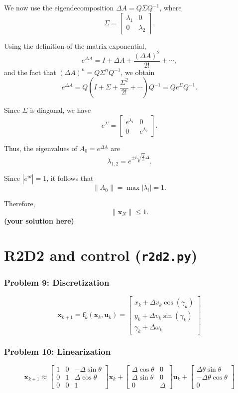 \documentclass[12pt,twoside]{article}
\newcommand\redt[1]{ {\textcolor[rgb]{0.60, 0.00, 0.00}{\textbf{ #1} } } }
\newcommand{\m}[1]{\boldsymbol{ #1}}
\newcommand{\yoursolution}{ \redt{(your solution here) } }
\begin{document}
We now use the eigendecomposition $\Delta A = Q \Sigma Q^{-1}$, where
\[
\Sigma =
\begin{bmatrix}
\lambda_1 & 0 \\
0 & \lambda_2
\end{bmatrix}.
\]

Using the definition of the matrix exponential,
\[
e^{\Delta A} = I + \Delta A + \frac{(\Delta A)^2}{2!} + \cdots,
\]
and the fact that $(\Delta A)^n = Q \Sigma^n Q^{-1}$, we obtain
\[
e^{\Delta A}
= Q \left( I + \Sigma + \frac{\Sigma^2}{2!} + \cdots \right) Q^{-1}
= Q e^{\Sigma} Q^{-1}.
\]

Since $\Sigma$ is diagonal, we have
\[
e^{\Sigma} =
\begin{bmatrix}
e^{\lambda_1} & 0 \\
0 & e^{\lambda_2}
\end{bmatrix}.
\]

Thus, the eigenvalues of $A_0 = e^{\Delta A}$ are
\[
\lambda_{1,2} = e^{\pm i \sqrt{\frac{g}{L}} \Delta}.
\]

Since $|e^{i\theta}| = 1$, it follows that
\[
\|A_0\| = \max |\lambda_i| = 1.
\]

Therefore,
$$
\| \mathbf{x}_N \| \leq 1.
$$
		\yoursolution
	
\section{R2D2 and control (\texttt{r2d2.py})}
\subsubsection*{{\color{red}Problem 9:  Discretization}}

$$
\m x_{k+1} = \m f_k(\m x_k, \m u_k) =
\begin{bmatrix}
x_k + \Delta v_k \cos(\gamma_k) \\
y_k + \Delta v_k \sin(\gamma_k) \\
\gamma_k + \Delta \omega_k
\end{bmatrix}
$$

\subsubsection*{{\color{red}Problem 10:  Linearization}}
	
$$
\m x_{k+1} \approx 
\begin{bmatrix}
1 & 0 & -\Delta \sin\theta \\
0 & 1 & \Delta \cos\theta \\
0 & 0 & 1
\end{bmatrix} \m x_k +
\begin{bmatrix}
\Delta \cos\theta & 0 \\
\Delta \sin\theta & 0 \\
0 & \Delta
\end{bmatrix} \m u_k +
\begin{bmatrix}
\Delta \theta \sin\theta \\
-\Delta \theta \cos\theta \\
0
\end{bmatrix}
$$
	
\end{document}
